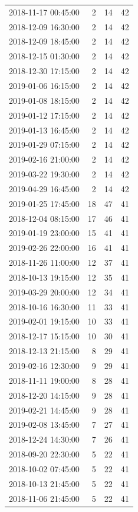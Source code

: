 \begin{tabular}{lrrr}
2018-11-17 00:45:00 & 2 & 14 & 42 \\
2018-12-09 16:30:00 & 2 & 14 & 42 \\
2018-12-09 18:45:00 & 2 & 14 & 42 \\
2018-12-15 01:30:00 & 2 & 14 & 42 \\
2018-12-30 17:15:00 & 2 & 14 & 42 \\
2019-01-06 16:15:00 & 2 & 14 & 42 \\
2019-01-08 18:15:00 & 2 & 14 & 42 \\
2019-01-12 17:15:00 & 2 & 14 & 42 \\
2019-01-13 16:45:00 & 2 & 14 & 42 \\
2019-01-29 07:15:00 & 2 & 14 & 42 \\
2019-02-16 21:00:00 & 2 & 14 & 42 \\
2019-03-22 19:30:00 & 2 & 14 & 42 \\
2019-04-29 16:45:00 & 2 & 14 & 42 \\
2019-01-25 17:45:00 & 18 & 47 & 41 \\
2018-12-04 08:15:00 & 17 & 46 & 41 \\
2019-01-19 23:00:00 & 15 & 41 & 41 \\
2019-02-26 22:00:00 & 16 & 41 & 41 \\
2018-11-26 11:00:00 & 12 & 37 & 41 \\
2018-10-13 19:15:00 & 12 & 35 & 41 \\
2019-03-29 20:00:00 & 12 & 34 & 41 \\
2018-10-16 16:30:00 & 11 & 33 & 41 \\
2019-02-01 19:15:00 & 10 & 33 & 41 \\
2018-12-17 15:15:00 & 10 & 30 & 41 \\
2018-12-13 21:15:00 & 8 & 29 & 41 \\
2019-02-16 12:30:00 & 9 & 29 & 41 \\
2018-11-11 19:00:00 & 8 & 28 & 41 \\
2018-12-20 14:15:00 & 9 & 28 & 41 \\
2019-02-21 14:45:00 & 9 & 28 & 41 \\
2019-02-08 13:45:00 & 7 & 27 & 41 \\
2018-12-24 14:30:00 & 7 & 26 & 41 \\
2018-09-20 22:30:00 & 5 & 22 & 41 \\
2018-10-02 07:45:00 & 5 & 22 & 41 \\
2018-10-13 21:45:00 & 5 & 22 & 41 \\
2018-11-06 21:45:00 & 5 & 22 & 41 \\

\end{tabular}
